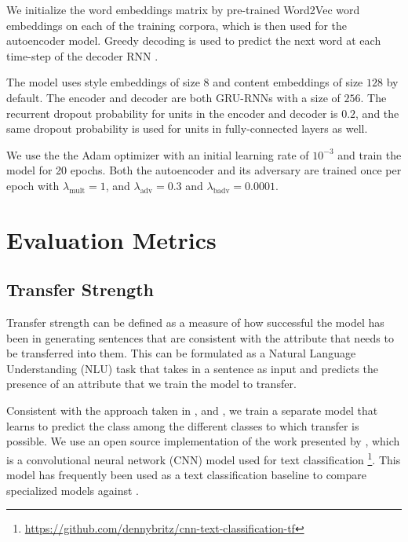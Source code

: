 We initialize the word embeddings matrix by pre-trained Word2Vec word embeddings \citep{mikolov2013efficient,mikolov2013distributed,mikolov2013linguistic} on each of the training corpora, which is then used for the autoencoder model. Greedy decoding  is used to predict the next word at each time-step of the decoder RNN \citep{germann2003greedy}.

The model uses style embeddings of size $8$ and content embeddings of size $128$ by default. The encoder and decoder are both GRU-RNNs with a size of $256$. The recurrent dropout probability for units in the encoder and decoder is $0.2$, and the same dropout probability is used for units in fully-connected layers as well.

We use the the Adam optimizer \citep{kingma2014adam} with an initial learning rate of $10^{-3}$ and train the model for 20 epochs. Both the autoencoder and its adversary are trained once per epoch with $\lambda_\text{mult} = 1$, and $\lambda_\text{adv} = 0.3$ and $\lambda_\text{badv} = 0.0001$.


\section{Evaluation Metrics} \label{sec:evaluation-metrics}

\subsection{Transfer Strength}

Transfer strength can be defined as a measure of how successful the model has been in generating sentences that are consistent with the attribute that needs to be transferred into them. This can be formulated as a Natural Language Understanding (NLU) task that takes in a sentence as input and predicts the presence of an attribute that we train the model to transfer.

Consistent with the approach taken in \cite{hu2017toward}, \cite{shen2017style} and \cite{fu2017style}, we train a separate model that learns to predict the class among the different classes to which transfer is possible. We use an open source implementation of the work presented by \cite{kim2014convolutional}, which is a convolutional neural network (CNN) model used for text classification \footnote{\url{https://github.com/dennybritz/cnn-text-classification-tf}}. This model has frequently been used as a text classification baseline to compare specialized models against \citep{tai2015improved} \citep{kiros2015skip} \citep{zhang2015character}.

